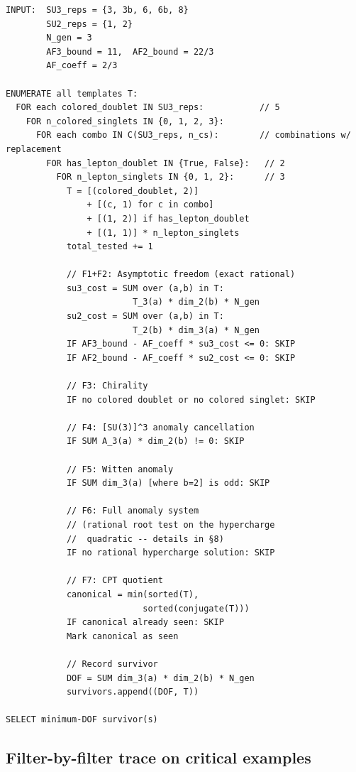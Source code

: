 \documentclass[11pt,a4paper]{article}
\theoremstyle{definition}
\begin{document}
\begin{small}
\begin{verbatim}
INPUT:  SU3_reps = {3, 3b, 6, 6b, 8}
        SU2_reps = {1, 2}
        N_gen = 3
        AF3_bound = 11,  AF2_bound = 22/3
        AF_coeff = 2/3

ENUMERATE all templates T:
  FOR each colored_doublet IN SU3_reps:           // 5
    FOR n_colored_singlets IN {0, 1, 2, 3}:
      FOR each combo IN C(SU3_reps, n_cs):        // combinations w/ replacement
        FOR has_lepton_doublet IN {True, False}:   // 2
          FOR n_lepton_singlets IN {0, 1, 2}:      // 3
            T = [(colored_doublet, 2)]
                + [(c, 1) for c in combo]
                + [(1, 2)] if has_lepton_doublet
                + [(1, 1)] * n_lepton_singlets
            total_tested += 1

            // F1+F2: Asymptotic freedom (exact rational)
            su3_cost = SUM over (a,b) in T:
                         T_3(a) * dim_2(b) * N_gen
            su2_cost = SUM over (a,b) in T:
                         T_2(b) * dim_3(a) * N_gen
            IF AF3_bound - AF_coeff * su3_cost <= 0: SKIP
            IF AF2_bound - AF_coeff * su2_cost <= 0: SKIP

            // F3: Chirality
            IF no colored doublet or no colored singlet: SKIP

            // F4: [SU(3)]^3 anomaly cancellation
            IF SUM A_3(a) * dim_2(b) != 0: SKIP

            // F5: Witten anomaly
            IF SUM dim_3(a) [where b=2] is odd: SKIP

            // F6: Full anomaly system
            // (rational root test on the hypercharge
            //  quadratic -- details in §8)
            IF no rational hypercharge solution: SKIP

            // F7: CPT quotient
            canonical = min(sorted(T),
                           sorted(conjugate(T)))
            IF canonical already seen: SKIP
            Mark canonical as seen

            // Record survivor
            DOF = SUM dim_3(a) * dim_2(b) * N_gen
            survivors.append((DOF, T))

SELECT minimum-DOF survivor(s)
\end{verbatim}
\end{small}


\subsection{Filter-by-filter trace on critical examples}
\label{app:filter_trace}
\end{document}
